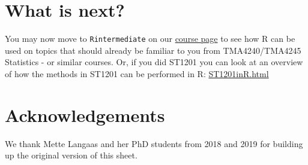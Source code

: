 \documentclass[]{article}
\begin{document}
\section{What is next?}\label{what-is-next}

You may now move to \texttt{Rintermediate} on our
\href{https://wiki.math.ntnu.no/tma4268/2020v/subpage1}{course page} to
see how R can be used on topics that should already be familiar to you
from TMA4240/TMA4245 Statistics - or similar courses. Or, if you did
ST1201 you can look at an overview of how the methods in ST1201 can be
performed in R:
\href{https://www.math.ntnu.no/emner/TMA4268/2019v/1Intro/ST1201inR.html}{ST1201inR.html}

\section{Acknowledgements}\label{acknowledgements}

We thank Mette Langaas and her PhD students from 2018 and 2019 for
building up the original version of this sheet.
\end{document}

